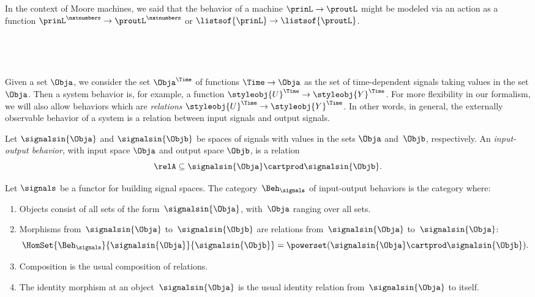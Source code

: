 
   
In the context of Moore machines, we said that the behavior of a machine $\prinL \to \proutL$ might be modeled via an action as a function $\prinL^\natnumbers \to \proutL^\natnumbers$ or $\listsof{\prinL} \to \listsof{\proutL}$. 

\

\



    Given a set $\Obja$, we consider the set $\Obja^\Time$ of functions $\Time \to \Obja$ as the set of time-dependent signals taking values in the set $\Obja$.
    Then a system behavior is, for example, a function $\styleobj{U}^\Time \to \styleobj{Y}^\Time$.
    For more flexibility in our formalism, we will also allow behaviors which are \emph{relations} $\styleobj{U}^\Time \to \styleobj{Y}^\Time$.
    In other words, in general, the externally observable behavior of a system is a relation between input signals and output signals.

    \begin{definition}
        Let $\signalsin{\Obja}$ and $\signalsin{\Objb}$ be spaces of signals with values in the sets $\Obja$ and~$\Objb$, respectively. 
        An \emph{input-output behavior}, with input space $\Obja$ and output space $\Objb$, is a relation
        \begin{equation*}
            \relA \subseteq \signalsin{\Obja} \cartprod \signalsin{\Objb}.
        \end{equation*}
    \end{definition}

    \begin{definition}
        Let $\signals$ be a functor for building signal spaces. 
        The category~$\Beh_\signals$ of input-output behaviors is the category where:
        \begin{enumerate}
            \item Objects consist of all sets of the form~$\signalsin{\Obja}$, with~$\Obja$ ranging over all sets.
            \item Morphisms from~$\signalsin{\Obja}$ to~$\signalsin{\Objb}$ are relations from~$\signalsin{\Obja}$ to~$\signalsin{\Obja}$:
                  \begin{equation}
                      \HomSet{\Beh_\signals}{\signalsin{\Obja}}{\signalsin{\Objb}} = \powerset (\signalsin{\Obja} \cartprod \signalsin{\Objb}).
                  \end{equation}
            \item Composition is the usual composition of relations.
            \item The identity morphism at an object~$\signalsin{\Obja}$ is the usual identity relation from~$\signalsin{\Obja}$ to itself.
        \end{enumerate}
    \end{definition}

